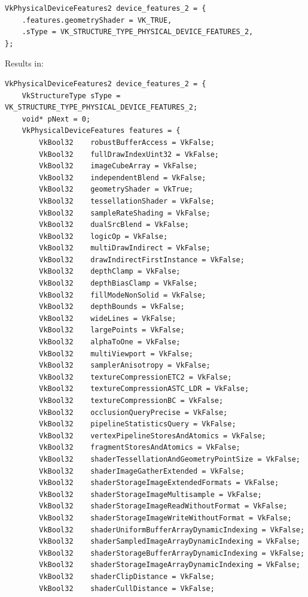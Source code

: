 \documentclass{article}
\begin{document}
\begin{lstlisting}[mathescape]
VkPhysicalDeviceFeatures2 device_features_2 = {
    .features.geometryShader = VK_TRUE,
    .sType = VK_STRUCTURE_TYPE_PHYSICAL_DEVICE_FEATURES_2,
};
\end{lstlisting}
Results in:
\begin{lstlisting}[mathescape]
VkPhysicalDeviceFeatures2 device_features_2 = {
    VkStructureType sType = VK_STRUCTURE_TYPE_PHYSICAL_DEVICE_FEATURES_2;
    void* pNext = 0;
    VkPhysicalDeviceFeatures features = {
        VkBool32    robustBufferAccess = VkFalse;
        VkBool32    fullDrawIndexUint32 = VkFalse;
        VkBool32    imageCubeArray = VkFalse;
        VkBool32    independentBlend = VkFalse;
        VkBool32    geometryShader = VkTrue;
        VkBool32    tessellationShader = VkFalse;
        VkBool32    sampleRateShading = VkFalse;
        VkBool32    dualSrcBlend = VkFalse;
        VkBool32    logicOp = VkFalse;
        VkBool32    multiDrawIndirect = VkFalse;
        VkBool32    drawIndirectFirstInstance = VkFalse;
        VkBool32    depthClamp = VkFalse;
        VkBool32    depthBiasClamp = VkFalse;
        VkBool32    fillModeNonSolid = VkFalse;
        VkBool32    depthBounds = VkFalse;
        VkBool32    wideLines = VkFalse;
        VkBool32    largePoints = VkFalse;
        VkBool32    alphaToOne = VkFalse;
        VkBool32    multiViewport = VkFalse;
        VkBool32    samplerAnisotropy = VkFalse;
        VkBool32    textureCompressionETC2 = VkFalse;
        VkBool32    textureCompressionASTC_LDR = VkFalse;
        VkBool32    textureCompressionBC = VkFalse;
        VkBool32    occlusionQueryPrecise = VkFalse;
        VkBool32    pipelineStatisticsQuery = VkFalse;
        VkBool32    vertexPipelineStoresAndAtomics = VkFalse;
        VkBool32    fragmentStoresAndAtomics = VkFalse;
        VkBool32    shaderTessellationAndGeometryPointSize = VkFalse;
        VkBool32    shaderImageGatherExtended = VkFalse;
        VkBool32    shaderStorageImageExtendedFormats = VkFalse;
        VkBool32    shaderStorageImageMultisample = VkFalse;
        VkBool32    shaderStorageImageReadWithoutFormat = VkFalse;
        VkBool32    shaderStorageImageWriteWithoutFormat = VkFalse;
        VkBool32    shaderUniformBufferArrayDynamicIndexing = VkFalse;
        VkBool32    shaderSampledImageArrayDynamicIndexing = VkFalse;
        VkBool32    shaderStorageBufferArrayDynamicIndexing = VkFalse;
        VkBool32    shaderStorageImageArrayDynamicIndexing = VkFalse;
        VkBool32    shaderClipDistance = VkFalse;
        VkBool32    shaderCullDistance = VkFalse;

\end{lstlisting}
\end{document}
